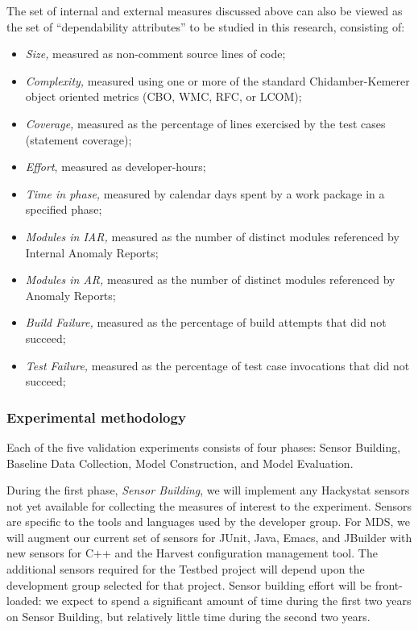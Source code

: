 The set of internal and external measures discussed above can also be viewed as the set of
``dependability attributes'' to be studied in this research, consisting of:
\begin{itemize}
\item {\em Size,} measured as non-comment source lines of code;
\item {\em Complexity,} measured using one or more of the standard Chidamber-Kemerer object oriented
metrics (CBO, WMC, RFC, or LCOM); 
\item {\em Coverage,} measured as the percentage of lines exercised by the
test cases (statement coverage);
\item {\em Effort}, measured as developer-hours;
\item {\em Time in phase,} measured by calendar days spent by a work
package in a specified phase;
\item {\em Modules in IAR,} measured as the number of distinct modules
referenced by Internal Anomaly Reports;
\item {\em Modules in AR,} measured as the number of distinct modules
referenced by Anomaly Reports;
\item {\em Build Failure,} measured as the percentage of build attempts
that did not succeed;
\item {\em Test Failure,} measured as the percentage of test case
invocations that did not succeed;
\end{itemize}


\subsubsection{Experimental methodology}
\label{sec:method}

Each of the five validation experiments consists of four phases: Sensor
Building, Baseline Data Collection, Model Construction, and Model
Evaluation. 

During the first phase, {\em Sensor Building}, we will implement any
Hackystat sensors not yet available for collecting the measures of interest
to the experiment.  Sensors are specific to the tools and languages used by
the developer group.  For MDS, we will augment our current set of sensors
for JUnit, Java, Emacs, and JBuilder with new sensors for C++ and the
Harvest configuration management tool.  The additional sensors required for 
the Testbed project will depend upon the development group selected for
that project. Sensor building effort will be front-loaded: we expect to
spend a significant amount of time during the first two years on Sensor Building, but
relatively little time during the second two years. 


